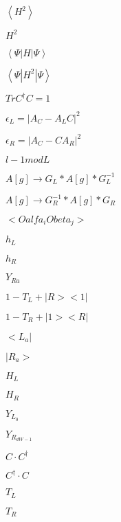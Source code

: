 \documentclass{article}
\begin{document}
$\left<H^2\right>$
\pagebreak

$H^2$
\pagebreak

$\left<\Psi|H|\Psi\right>$
\pagebreak

$\left<\Psi|H^2|\Psi\right>$
\pagebreak

$Tr C^{\dagger} C = 1$
\pagebreak

$\epsilon_L=\big|A_C-A_LC\big|^2$
\pagebreak

$\epsilon_R=\big|A_C-CA_R\big|^2$
\pagebreak

$l-1 mod L$
\pagebreak

$A[g] \rightarrow G_L*A[g]*G_L^{-1}$
\pagebreak

$A[g] \rightarrow G_R^{-1}*A[g]*G_R$
\pagebreak

$<Oalfa_i Obeta_j>$
\pagebreak

$h_L$
\pagebreak

$h_R$
\pagebreak

$Y_{Ra}$
\pagebreak

$1-T_L+|R><1|$
\pagebreak

$1-T_R+|1><R|$
\pagebreak

$<L_a|$
\pagebreak

$|R_a>$
\pagebreak

$H_L$
\pagebreak

$H_R$
\pagebreak

$Y_{L_{0}}$
\pagebreak

$Y_{R_{dW-1}}$
\pagebreak

$C \cdot C^{\dagger}$
\pagebreak

$C^{\dagger} \cdot C$
\pagebreak

$T_L$
\pagebreak

$T_R$
\pagebreak
\end{document}
